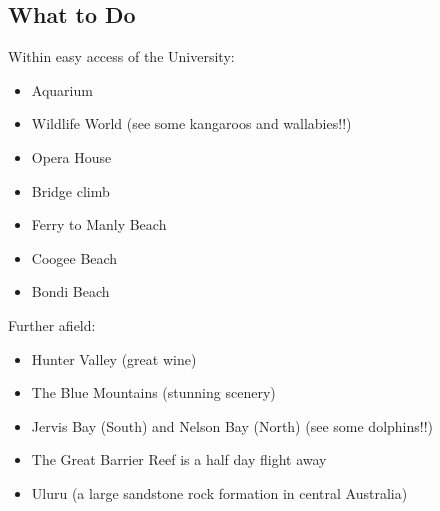 {}
\subsection*{What to Do}
Within easy access of the University:
\begin{itemize}
 \item Aquarium
\item Wildlife World (see some kangaroos and wallabies!!)
\item Opera House
\item Bridge climb
\item Ferry to Manly Beach
\item Coogee Beach
\item Bondi Beach
\end{itemize}

Further afield:
\begin{itemize}
 \item Hunter Valley (great wine)
\item The Blue Mountains (stunning scenery)
\item Jervis Bay (South) and Nelson Bay (North) (see some dolphins!!)
\item The Great Barrier Reef is a half day flight away
\item Uluru (a large sandstone rock formation in central Australia) 
\end{itemize}

